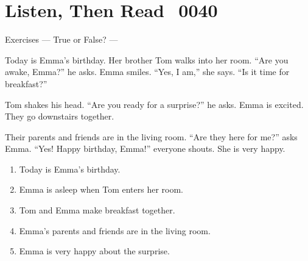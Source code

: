 \documentclass[aspectratio=169,xcolor={dvipsnames,table}]{beamer}
\newcommand{\myaudio}[1]{\href{#1}{\faVolumeUp}}
\begin{document}
\section{Listen, Then Read\,\,\,\,\,{\tiny 0040}\,{\scriptsize \myaudio{./audio/008_question_be_reading.mp3}}}
\begin{frame}[plain,t]{Exercises --- True or False? ---}
\vspace*{-7pt}
\begin{tcolorbox}[colframe=ForestGreen,
  colback=NavyBlue!10!white,
  colbacktitle=NavyBlue!40!white,
  coltitle=black, %
before upper={\setlength{\parindent}{1.25em}},
 title={A Surprise for Emma\hfill{\tiny 0040}\quad{\scriptsize \myaudio{./audio/008_question_be_reading.mp3}}}
]
\noindent{}Today is Emma's birthday. Her brother Tom walks into her room. ``Are you awake, Emma?'' he asks. Emma smiles. ``Yes, I am,'' she says. ``Is it time for breakfast?''

Tom shakes his head. ``Are you ready for a surprise?'' he asks. Emma is excited. They go downstairs together.

Their parents and friends are in the living room. ``Are they here for me?'' asks Emma. ``Yes! Happy birthday, Emma!'' everyone shouts. She is very happy.
\end{tcolorbox}

\vspace{-6pt}
\begin{enumerate}\setlength{\itemsep}{-3.5pt}
\item<2-> Today is Emma's birthday.\hfill{}
\item<2-> Emma is asleep when Tom enters her room.\hfill{}
\item<2-> Tom and Emma make breakfast together.\hfill{}
\item<2-> Emma's parents and friends are in the living room.\hfill{}
\item<2-> Emma is very happy about the surprise.\hfill{}
\end{enumerate}
\end{frame}
\end{document}
